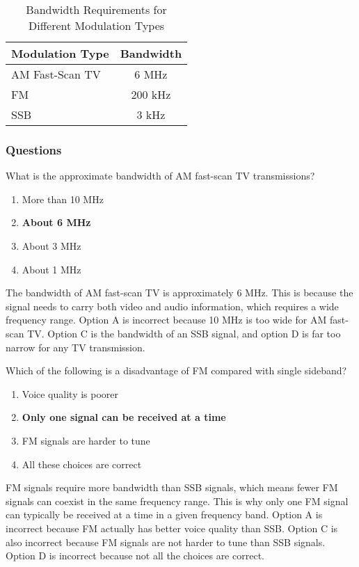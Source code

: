 \begin{table}[h]
    \centering
    \begin{tabular}{|l|c|}
        \hline
        \textbf{Modulation Type} & \textbf{Bandwidth} \\
        \hline
        AM Fast-Scan TV & 6 MHz \\
        FM & 200 kHz \\
        SSB & 3 kHz \\
        \hline
    \end{tabular}
    \caption{Bandwidth Requirements for Different Modulation Types}
    \label{tab:bandwidth-requirements}
\end{table}

\subsubsection*{Questions}

\begin{tcolorbox}[colback=gray!10!white,colframe=black!75!black,title={T8A10}]
    What is the approximate bandwidth of AM fast-scan TV transmissions?
    \begin{enumerate}[label=\Alph*),noitemsep]
        \item More than 10 MHz
        \item \textbf{About 6 MHz}
        \item About 3 MHz
        \item About 1 MHz
    \end{enumerate}
\end{tcolorbox}

The bandwidth of AM fast-scan TV is approximately 6 MHz. This is because the signal needs to carry both video and audio information, which requires a wide frequency range. Option A is incorrect because 10 MHz is too wide for AM fast-scan TV. Option C is the bandwidth of an SSB signal, and option D is far too narrow for any TV transmission.

\begin{tcolorbox}[colback=gray!10!white,colframe=black!75!black,title={T8A12}]
    Which of the following is a disadvantage of FM compared with single sideband?
    \begin{enumerate}[label=\Alph*),noitemsep]
        \item Voice quality is poorer
        \item \textbf{Only one signal can be received at a time}
        \item FM signals are harder to tune
        \item All these choices are correct
    \end{enumerate}
\end{tcolorbox}

FM signals require more bandwidth than SSB signals, which means fewer FM signals can coexist in the same frequency range. This is why only one FM signal can typically be received at a time in a given frequency band. Option A is incorrect because FM actually has better voice quality than SSB. Option C is also incorrect because FM signals are not harder to tune than SSB signals. Option D is incorrect because not all the choices are correct.
